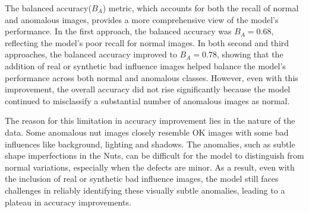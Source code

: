 \documentclass[12pt,DIV14,BCOR12mm,a4paper,footinclude=false,headinclude,parskip=half-,twoside,openright,cleardoublepage=empty,toc=index,bibliography=totoc,listof=totoc]{scrreprt}
\numberwithin{equation}{chapter}
\begin{document}
The balanced accuracy(\( B_A \)) metric, which accounts for both the recall of normal and anomalous images, provides a more comprehensive view of the model's performance. In the first approach, the balanced accuracy was \( B_A = 0.68 \), reflecting the model's poor recall for normal images. In both second and third approaches, the balanced accuracy improved to \( B_A = 0.78 \), showing that the addition of real or synthetic bad influence images helped balance the model's performance across both normal and anomalous classes. However, even with this improvement, the overall accuracy did not rise significantly because the model continued to misclassify a substantial number of anomalous images as normal.

The reason for this limitation in accuracy improvement lies in the nature of the data. Some anomalous nut images closely resemble OK images with some bad influences like background, lighting and shadows. The anomalies, such as subtle shape imperfections in the Nuts, can be difficult for the model to distinguish from normal variations, especially when the defects are minor. As a result, even with the inclusion of real or synthetic bad influence images, the model still faces challenges in reliably identifying these visually subtle anomalies, leading to a plateau in accuracy improvements.
\end{document}
